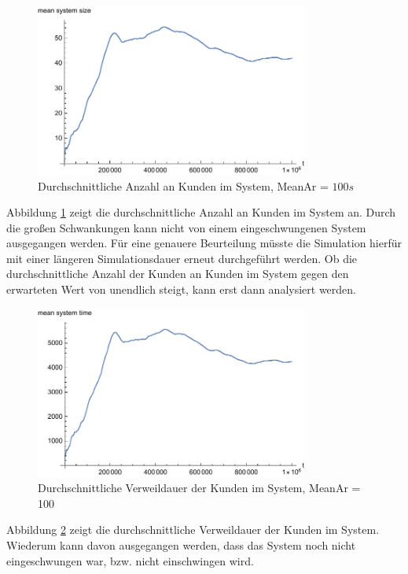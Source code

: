 \begin{figure}[htpb]
	\centering
	\includegraphics[width=0.8\textwidth]{abbildungen/1_Phone/Arrival_100_Serve_100_dur_1000000_Skip_0/MeanSystemSize.pdf}
	\caption{Durchschnittliche Anzahl an Kunden im System, MeanAr = $100s$}
	\label{fig:meanSystemSize100}
\end{figure}

Abbildung \ref{fig:meanSystemSize100} zeigt die durchschnittliche Anzahl an Kunden im System an. Durch die großen Schwankungen kann nicht von einem eingeschwungenen System ausgegangen werden. Für eine genauere Beurteilung müsste die Simulation hierfür mit einer längeren Simulationsdauer erneut durchgeführt werden. Ob die durchschnittliche Anzahl der Kunden an Kunden im System gegen den erwarteten Wert von unendlich steigt, kann erst dann analysiert werden.

\begin{figure}[htpb]
	\centering
	\includegraphics[width=0.8\textwidth]{abbildungen/1_Phone/Arrival_100_Serve_100_dur_1000000_Skip_0/MeanSystemTime.pdf}
	\caption{Durchschnittliche Verweildauer der Kunden im System, MeanAr = 100}
	\label{fig:meanSystemTime100}
\end{figure}

Abbildung \ref{fig:meanSystemTime100} zeigt die durchschnittliche Verweildauer der Kunden im System. Wiederum kann davon ausgegangen werden, dass das System noch nicht eingeschwungen war, bzw. nicht einschwingen wird.

